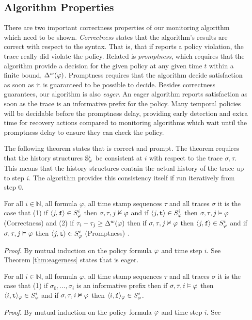 \subsection{Algorithm Properties}
There are two important correctness properties of our monitoring algorithm which need to be shown. \emph{Correctness} states that the algorithm's results are correct with respect to the syntax. That is, that if \monitor reports a policy violation, the trace really did violate the policy. Related is \emph{promptness}, which requires that the algorithm provide a decision for the given policy at any given time $t$ within a finite bound, $\Delta^w(\varphi)$. Promptness requires that the algorithm decide satisfaction as soon as it is guaranteed to be possible to decide. 
%
Besides correctness guarantees, our algorithm is also \emph{eager}. An eager algorithm reports satisfaction as soon as the trace is an informative prefix \cite{Kupferman2001} for the policy. Many temporal policies will be decidable before the promptness delay, providing early detection and extra time for recovery actions compared to monitoring algorithms which wait until the promptness delay to ensure they can check the policy. 

The following theorem states that \monitor is correct and prompt. The theorem requires that the history structures $\mathbb{S}^{i}_{\varphi}$ be consistent at $i$ with respect to the trace $\sigma,\tau$. This means that the history structures contain the actual history of the trace up to step $i$. The algorithm provides this consistency itself if run iteratively from step $0$.

\begin{theorem}
For all $i \in \mathbb{N}$, all formula $\varphi$, all time stamp sequences $\tau$ and all traces $\sigma$ it is the case that (1) if $\langle j, \mathrm{\texttt{f}} \rangle \in {S}^{i}_{\varphi}$ then $\sigma, \tau, j \nvDash \varphi$ and if $\langle j, \mathrm{\texttt{t}} \rangle \in {S}^{i}_{\varphi}$ then $\sigma, \tau, j \vDash \varphi$ (Correctness) and (2) if $\tau_i - \tau_j \geq \Delta^w(\varphi)$ then if $\sigma, \tau, j \nvDash \varphi$ then $\langle j, \mathrm{\texttt{f}} \rangle \in {S}^{i}_{\varphi}$ and if $\sigma, \tau, j \vDash \varphi$ then $\langle j, \mathrm{\texttt{t}} \rangle \in {S}^{i}_{\varphi}$ (Promptness)
.
\end{theorem}
\textit{Proof.} By mutual induction on the policy formula $\varphi$ and time step $i$. See \cite{TechPaper} \\

Theorem \ref{thm:eagerness} states that \monitor is eager. 

\begin{theorem}
\label{thm:eagerness}
For all $i \in \mathbb{N}$, all formula $\varphi$, all time stamp sequences $\tau$ and all traces $\sigma$ it is the case that (1) if $\sigma_0,\ldots,\sigma_i$ is an informative prefix then if $\sigma,\tau, i \vDash \varphi$ then $\langle i, \mathrm{\texttt{t}} \rangle_{\varphi} \in {S}^{i}_{\varphi}$ and if $\sigma, \tau, i \nvDash \varphi$ then $\langle i, \mathrm{\texttt{f}} \rangle_{\varphi} \in {S}^{i}_{\varphi}$. 
\end{theorem}
\textit{Proof.} By mutual induction on the policy formula $\varphi$ and time step $i$. See \cite{TechPaper}
